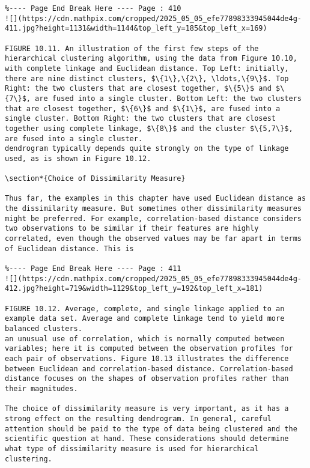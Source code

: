 \documentclass[10pt]{article}
\begin{document}
\begin{verbatim}
%---- Page End Break Here ---- Page : 410
![](https://cdn.mathpix.com/cropped/2025_05_05_efe77898333945044de4g-411.jpg?height=1131&width=1144&top_left_y=185&top_left_x=169)

FIGURE 10.11. An illustration of the first few steps of the hierarchical clustering algorithm, using the data from Figure 10.10, with complete linkage and Euclidean distance. Top Left: initially, there are nine distinct clusters, $\{1\},\{2\}, \ldots,\{9\}$. Top Right: the two clusters that are closest together, $\{5\}$ and $\{7\}$, are fused into a single cluster. Bottom Left: the two clusters that are closest together, $\{6\}$ and $\{1\}$, are fused into a single cluster. Bottom Right: the two clusters that are closest together using complete linkage, $\{8\}$ and the cluster $\{5,7\}$, are fused into a single cluster.
dendrogram typically depends quite strongly on the type of linkage used, as is shown in Figure 10.12.

\section*{Choice of Dissimilarity Measure}

Thus far, the examples in this chapter have used Euclidean distance as the dissimilarity measure. But sometimes other dissimilarity measures might be preferred. For example, correlation-based distance considers two observations to be similar if their features are highly correlated, even though the observed values may be far apart in terms of Euclidean distance. This is

%---- Page End Break Here ---- Page : 411
![](https://cdn.mathpix.com/cropped/2025_05_05_efe77898333945044de4g-412.jpg?height=719&width=1129&top_left_y=192&top_left_x=181)

FIGURE 10.12. Average, complete, and single linkage applied to an example data set. Average and complete linkage tend to yield more balanced clusters.
an unusual use of correlation, which is normally computed between variables; here it is computed between the observation profiles for each pair of observations. Figure 10.13 illustrates the difference between Euclidean and correlation-based distance. Correlation-based distance focuses on the shapes of observation profiles rather than their magnitudes.

The choice of dissimilarity measure is very important, as it has a strong effect on the resulting dendrogram. In general, careful attention should be paid to the type of data being clustered and the scientific question at hand. These considerations should determine what type of dissimilarity measure is used for hierarchical clustering.


\end{verbatim}
\end{document}
